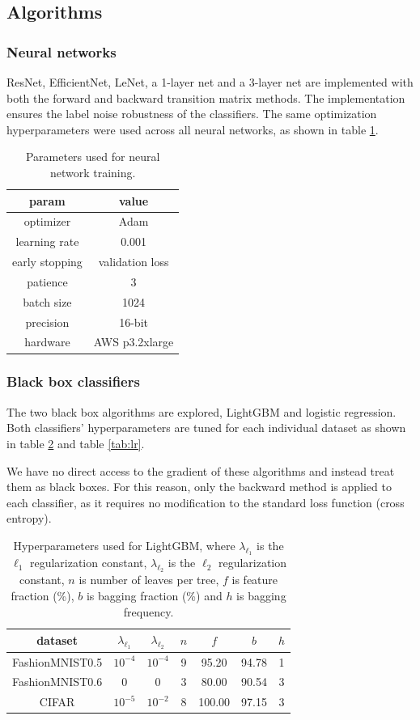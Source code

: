 \documentclass{article} %
\begin{document}
\subsection{Algorithms}
\subsubsection{Neural networks}
ResNet, EfficientNet, LeNet, a 1-layer net and a 3-layer net are implemented with both the forward and backward transition matrix methods. The implementation ensures the label noise robustness of the classifiers. The same optimization hyperparameters were used across all neural networks, as shown in table \ref{tab:nn}.

\begin{table}\begin{tabular}{cc} param & value\\\hline
optimizer & Adam\\
learning rate & 0.001\\
early stopping & validation loss\\
patience & 3\\
batch size & 1024\\
precision & 16-bit\\
hardware & AWS p3.2xlarge
\end{tabular}\caption{Parameters used for neural network training. \label{tab:nn}}\end{table}

\subsubsection{Black box classifiers}
The two black box algorithms are explored, LightGBM and logistic regression. Both classifiers' hyperparameters are tuned for each individual dataset as shown in table \ref{tab:lgb} and table \ref{tab:lr}.

We have no direct access to the gradient of these algorithms and instead treat them as black boxes. For this reason, only the backward method is applied to each classifier, as it requires no modification to the standard loss function (cross entropy).

\begin{table}\begin{tabular}{ccccccc} dataset & $\lambda_{\ell_1}$ & $\lambda_{\ell_2}$ & $n$ & $f$ & $b$ & $h$\\\hline
FashionMNIST0.5 & $10^{-4}$ & $10^{-4}$ & 9 & 95.20 & 94.78 & 1\\
FashionMNIST0.6 & 0 & 0 & 3 & 80.00 & 90.54 & 3\\
CIFAR & $10^{-5}$ & $10^{-2}$ & 8 & 100.00 & 97.15 & 3
\end{tabular}\caption{
  Hyperparameters used for LightGBM, where $\lambda_{\ell_1}$ is the $\ell_1$ regularization constant, $\lambda_{\ell_2}$ is the $\ell_2$ regularization constant, $n$ is number of leaves per tree, $f$ is feature fraction (\%), $b$ is bagging fraction (\%) and $h$ is bagging frequency.
  \label{tab:lgb}
}\end{table}
\end{document}
